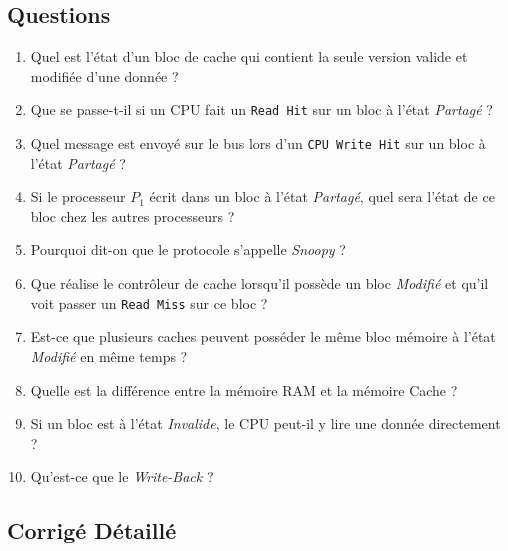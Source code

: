 \documentclass[12pt,a4paper]{article}
\begin{document}
\subsection{Questions}
\begin{enumerate}[label=\textbf{Q\arabic*:}]
    \item Quel est l'état d'un bloc de cache qui contient la seule version valide et modifiée d'une donnée ?
    \item Que se passe-t-il si un CPU fait un \texttt{Read Hit} sur un bloc à l'état \textit{Partagé} ?
    \item Quel message est envoyé sur le bus lors d'un \texttt{CPU Write Hit} sur un bloc à l'état \textit{Partagé} ?
    \item Si le processeur $P_1$ écrit dans un bloc à l'état \textit{Partagé}, quel sera l'état de ce bloc chez les autres processeurs ?
    \item Pourquoi dit-on que le protocole s'appelle \textit{Snoopy} ?
    \item Que réalise le contrôleur de cache lorsqu'il possède un bloc \textit{Modifié} et qu'il voit passer un \texttt{Read Miss} sur ce bloc ?
    \item Est-ce que plusieurs caches peuvent posséder le même bloc mémoire à l'état \textit{Modifié} en même temps ?
    \item Quelle est la différence entre la mémoire RAM et la mémoire Cache ?
    \item Si un bloc est à l'état \textit{Invalide}, le CPU peut-il y lire une donnée directement ?
    \item Qu'est-ce que le \textit{Write-Back} ?
\end{enumerate}

\newpage
\subsection{Corrigé Détaillé}
\end{document}
